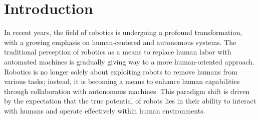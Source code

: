 
\chapter{Introduction} %
\label{ch:intro} %




In recent years, the field of robotics is undergoing a profound transformation, with a growing emphasis on human-centered and autonomous systems. The traditional perception of robotics as a means to replace human labor with automated machines is gradually giving way to a more human-oriented approach. Robotics is no longer solely about exploiting robots to remove humans from various tasks; instead, it is becoming a means to enhance human capabilities 
through collaboration with autonomous machines. This paradigm shift is driven by the expectation that the true potential of robots lies in their ability to interact with humans and operate effectively within human environments.

